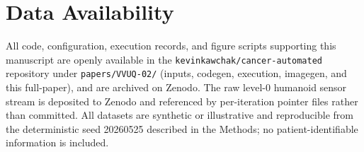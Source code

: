 {}
\section*{Data Availability}
\label{sec:data}

All code, configuration, execution records, and figure scripts supporting this
manuscript are openly available in the \texttt{kevinkawchak/cancer-automated}
repository under \texttt{papers/VVUQ-02/} (inputs, codegen, execution, imagegen,
and this full-paper), and are archived on Zenodo. The raw level-0 humanoid sensor
stream is deposited to Zenodo and referenced by per-iteration pointer files rather
than committed. All datasets are synthetic or illustrative and reproducible from
the deterministic seed 20260525 described in the Methods; no patient-identifiable
information is included.
